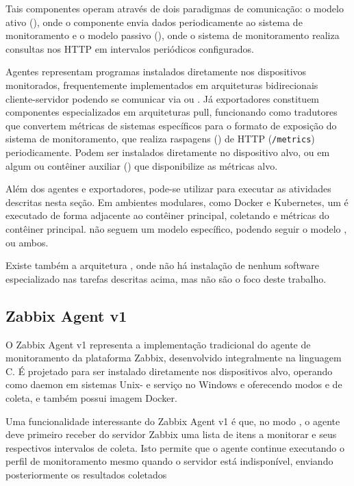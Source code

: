 Tais componentes operam através de dois paradigmas de comunicação: o modelo ativo (), onde o componente envia dados periodicamente ao sistema de monitoramento e o modelo passivo (), onde o sistema de monitoramento realiza consultas nos  HTTP em intervalos periódicos configurados.

Agentes representam programas instalados diretamente nos dispositivos monitorados, frequentemente implementados em arquiteturas bidirecionais cliente-servidor podendo se comunicar via  ou . Já exportadores  constituem componentes especializados em arquiteturas pull, funcionando como tradutores que convertem métricas de sistemas específicos para o formato de exposição do sistema de monitoramento, que realiza raspagens () de  HTTP (\verb|/metrics|) periodicamente. Podem ser instalados diretamente no dispositivo alvo, ou em algum  ou contêiner auxiliar () que disponibilize as métricas alvo.

Além dos agentes e exportadores, pode-se utilizar  para executar as atividades descritas nesta seção. Em ambientes modulares, como Docker e Kubernetes, um  é executado de forma adjacente ao contêiner principal, coletando  e métricas do contêiner principal.  não seguem um modelo específico, podendo seguir o modelo ,  ou ambos.

Existe também a arquitetura , onde não há instalação de nenhum software especializado nas tarefas descritas acima, mas não são o foco deste trabalho.

\subsection{Zabbix Agent v1}
\label{subsection:ZabbixAgentV1}

O Zabbix Agent v1 \citep{zabbix2025} representa a implementação tradicional do agente de monitoramento da plataforma Zabbix, desenvolvido integralmente na linguagem C. É projetado para ser instalado diretamente nos dispositivos alvo, operando como daemon em sistemas Unix- e serviço no Windows e oferecendo modos  e  de coleta, e também possui imagem Docker.

Uma funcionalidade interessante do Zabbix Agent v1 é que, no modo , o agente deve primeiro receber do servidor Zabbix uma lista de itens a monitorar e seus respectivos intervalos de coleta. Isto permite que o agente continue executando o perfil de monitoramento mesmo quando o servidor está indisponível, enviando posteriormente os resultados coletados

